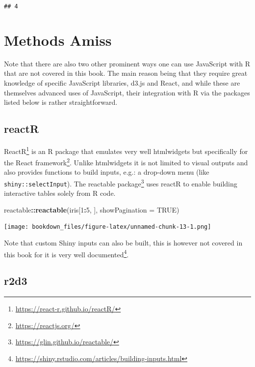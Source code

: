 \documentclass[
]{krantz}
\makeatletter
\newenvironment{Shaded}{\begin{snugshade}}{\end{snugshade}}
\newcommand{\DataTypeTok}[1]{\textcolor[rgb]{0.27,0.27,0.27}{#1}}
\newcommand{\DecValTok}[1]{\textcolor[rgb]{0.06,0.06,0.06}{#1}}
\newcommand{\KeywordTok}[1]{\textcolor[rgb]{0.27,0.27,0.27}{\textbf{#1}}}
\newcommand{\NormalTok}[1]{#1}
\newcommand{\OperatorTok}[1]{\textcolor[rgb]{0.43,0.43,0.43}{\textbf{#1}}}
\newcommand{\OtherTok}[1]{\textcolor[rgb]{0.37,0.37,0.37}{#1}}
\renewcommand{\href}[2]{#2\footnote{\url{#1}}}
\newenvironment{kframe}{%
\medskip{}
\setlength{\fboxsep}{.8em}
 \def\at@end@of@kframe{}%
 \ifinner\ifhmode%
  \def\at@end@of@kframe{\end{minipage}}%
  \begin{minipage}{\columnwidth}%
 \fi\fi%
 \def\FrameCommand##1{\hskip\@totalleftmargin \hskip-\fboxsep
 \colorbox{shadecolor}{##1}\hskip-\fboxsep
     \hskip-\linewidth \hskip-\@totalleftmargin \hskip\columnwidth}%
 \MakeFramed {\advance\hsize-\width
   \@totalleftmargin\z@ \linewidth\hsize
   \@setminipage}}%
 {\par\unskip\endMakeFramed%
 \at@end@of@kframe}
\renewenvironment{Shaded}{\begin{kframe}}{\end{kframe}}
\makeatother
\begin{document}
\begin{verbatim}
## 4
\end{verbatim}

\hypertarget{methods-amiss}{%
\section*{Methods Amiss}\label{methods-amiss}}


Note that there are also two other prominent ways one can use JavaScript with R that are not covered in this book. The main reason being that they require great knowledge of specific JavaScript libraries, d3.js and React, and while these are themselves advanced uses of JavaScript, their integration with R via the packages listed below is rather straightforward.

\hypertarget{reactr}{%
\subsection*{reactR}\label{reactr}}


\href{https://react-r.github.io/reactR/}{ReactR} \citep{R-reactR} is an R package that emulates very well htmlwidgets but specifically for the \href{https://reactjs.org/}{React framework}. Unlike htmlwidgets it is not limited to visual outputs and also provides functions to build inputs, e.g.: a drop-down menu (like \texttt{shiny::selectInput}). The \href{https://glin.github.io/reactable/}{reactable package} \citep{R-reactable} uses reactR to enable building interactive tables solely from R code.

\begin{Shaded}
\begin{Highlighting}[]
\NormalTok{reactable}\OperatorTok{::}\KeywordTok{reactable}\NormalTok{(iris[}\DecValTok{1}\OperatorTok{:}\DecValTok{5}\NormalTok{, ], }\DataTypeTok{showPagination =} \OtherTok{TRUE}\NormalTok{)}
\end{Highlighting}
\end{Shaded}

\texttt{[image: bookdown\_files/figure-latex/unnamed-chunk-13-1.png]}

Note that custom Shiny inputs can also be built, this is however not covered in this book for it is very well \href{https://shiny.rstudio.com/articles/building-inputs.html}{documented}.

\hypertarget{r2d3}{%
\subsection*{r2d3}\label{r2d3}}
\end{document}
